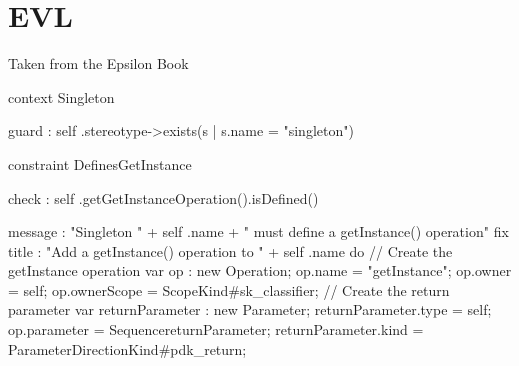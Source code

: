\chapter{EVL}

Taken from the Epsilon Book
\begin{evl}
context Singleton {
    
    guard : self .stereotype->exists(s | s.name = "singleton")
    
    constraint DefinesGetInstance {
        check : self .getGetInstanceOperation().isDefined()
        
        message : "Singleton " + self .name + " must define a getInstance() operation"
        fix {
            title : "Add a getInstance() operation to " + self .name
            do {
                // Create the getInstance operation
                var op : new Operation;
                op.name = "getInstance";
                op.owner = self;
                op.ownerScope = ScopeKind#sk_classifier;
                // Create the return parameter
                var returnParameter : new Parameter;
                returnParameter.type = self;
                op.parameter = Sequence{returnParameter};
                returnParameter.kind = ParameterDirectionKind#pdk_return;
            }
        }
    }
}
\end{evl}